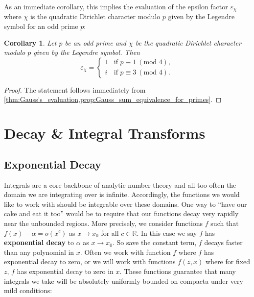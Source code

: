 \documentclass[12pt]{book}
\newtheorem{corollary}{Corollary}[section]
\theoremstyle{definition}\newframedtheorem{method}{Method}
\newcommand{\tmod}[1]{\ \left(\text{mod }#1\right)}
\newcommand{\R}{\mathbb{R}}
\renewcommand{\a}{\alpha}
\newcommand{\e}{\varepsilon}
\newcommand{\<}{\langle}
\renewcommand{\>}{\rangle}
\begin{document}
      As an immediate corollary, this implies the evaluation of the epsilon factor $\e_{\chi}$ where $\chi$ is the quadratic Dirichlet character modulo $p$ given by the Legendre symbol for an odd prime $p$:

      \begin{corollary}
        Let $p$ be an odd prime and $\chi$ be the quadratic Dirichlet character modulo $p$ given by the Legendre symbol. Then
        \[
          \e_{\chi} = \begin{cases} 1 & \text{if $p \equiv 1 \tmod{4}$}, \\ i & \text{if $p \equiv 3 \tmod{4}$}. \end{cases}
        \]
      \end{corollary}
      \begin{proof}
        The statement follows immediately from \cref{thm:Gauss's_evaluation,prop:Gauss_sum_equivalence_for_primes}.
      \end{proof}
  \section{Decay \& Integral Transforms}
    \subsection*{Exponential Decay}
      Integrals are a core backbone of analytic number theory and all too often the domain we are integrating over is infinite. Accordingly, the functions we would like to work with should be integrable over these domains. One way to ``have our cake and eat it too'' would be to require that our functions decay very rapidly near the unbounded regions. More precisely, we consider functions $f$ such that $f(x)-\a = o(x^{c})$ as $x \to x_{0}$ for all $c \in \R$. In this case we say $f$ has \textbf{exponential decay} to $\a$ as $x \to x_{0}$. So save the constant term, $f$ decays faster than any polynomial in $x$. Often we work with function $f$ where $f$ has exponential decay to zero, or we will work with functions $f(z,x)$ where for fixed $z$, $f$ has exponential decay to zero in $x$. These functions guarantee that many integrals we take will be absolutely uniformly bounded on compacta under very mild conditions:
\end{document}
